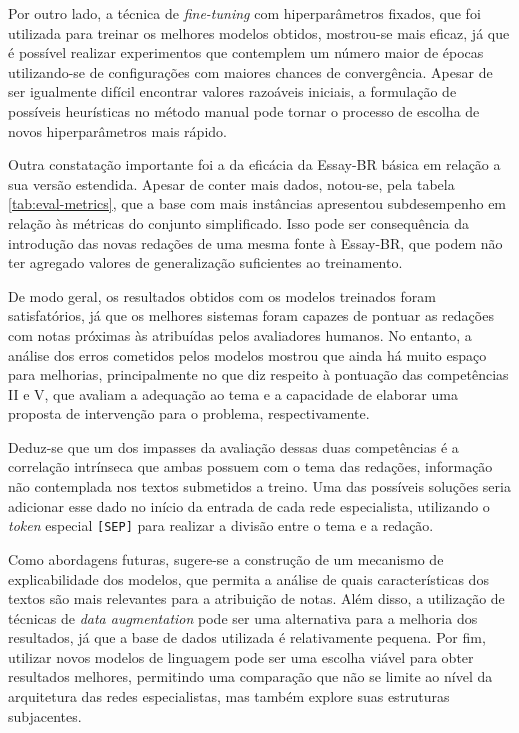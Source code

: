 Por outro lado, a técnica de \textit{fine-tuning} com hiperparâmetros fixados, que foi utilizada para treinar os melhores modelos obtidos, mostrou-se mais eficaz, já que é possível realizar experimentos que contemplem um número maior de épocas utilizando-se de configurações com maiores chances de convergência. Apesar de ser igualmente difícil encontrar valores razoáveis iniciais, a formulação de possíveis heurísticas no método manual pode tornar o processo de escolha de novos hiperparâmetros mais rápido.

Outra constatação importante foi a da eficácia da Essay-BR básica em relação a sua versão estendida. Apesar de conter mais dados, notou-se, pela tabela \ref{tab:eval-metrics}, que a base com mais instâncias apresentou subdesempenho em relação às métricas do conjunto simplificado. Isso pode ser consequência da introdução das novas redações de uma mesma fonte à Essay-BR, que podem não ter agregado valores de generalização suficientes ao treinamento.

De modo geral, os resultados obtidos com os modelos treinados foram satisfatórios, já que os melhores sistemas foram capazes de pontuar as redações com notas próximas às atribuídas pelos avaliadores humanos. No entanto, a análise dos erros cometidos pelos modelos mostrou que ainda há muito espaço para melhorias, principalmente no que diz respeito à pontuação das competências II e V, que avaliam a adequação ao tema e a capacidade de elaborar uma proposta de intervenção para o problema, respectivamente.

Deduz-se que um dos impasses da avaliação dessas duas competências é a correlação intrínseca que ambas possuem com o tema das redações, informação não contemplada nos textos submetidos a treino. Uma das possíveis soluções seria adicionar esse dado no início da entrada de cada rede especialista, utilizando o \textit{token} especial \texttt{[SEP]} para realizar a divisão entre o tema e a redação.

Como abordagens futuras, sugere-se a construção de um mecanismo de explicabilidade dos modelos, que permita a análise de quais características dos textos são mais relevantes para a atribuição de notas. Além disso, a utilização de técnicas de \textit{data augmentation} pode ser uma alternativa para a melhoria dos resultados, já que a base de dados utilizada é relativamente pequena. Por fim, utilizar novos modelos de linguagem pode ser uma escolha viável para obter resultados melhores, permitindo uma comparação que não se limite ao nível da arquitetura das redes especialistas, mas também explore suas estruturas subjacentes.

